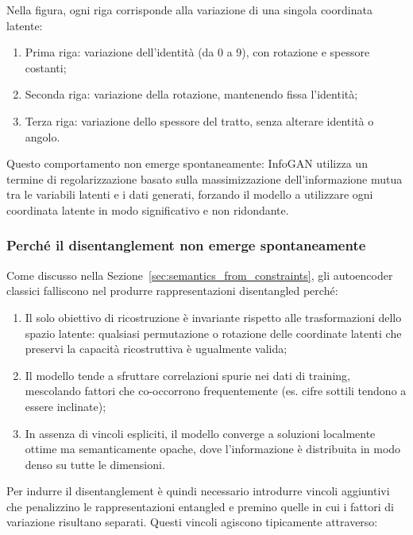 Nella figura, ogni riga corrisponde alla variazione di una singola coordinata latente:
\begin{enumerate}[label=\roman*.]
    \item Prima riga: variazione dell'identità (da 0 a 9), con rotazione e spessore costanti;
    \item Seconda riga: variazione della rotazione, mantenendo fissa l'identità;
    \item Terza riga: variazione dello spessore del tratto, senza alterare identità o angolo.
\end{enumerate}

Questo comportamento non emerge spontaneamente: InfoGAN utilizza un termine di regolarizzazione basato sulla massimizzazione dell'informazione mutua tra le variabili latenti e i dati generati, forzando il modello a utilizzare ogni coordinata latente in modo significativo e non ridondante.

\subsubsection{Perché il disentanglement non emerge spontaneamente}

Come discusso nella Sezione~\ref{sec:semantics_from_constraints}, gli autoencoder classici falliscono nel produrre rappresentazioni disentangled perché:

\begin{enumerate}[label=\roman*.]
    \item Il solo obiettivo di ricostruzione è invariante rispetto alle trasformazioni dello spazio latente: qualsiasi permutazione o rotazione delle coordinate latenti che preservi la capacità ricostruttiva è ugualmente valida;
    \item Il modello tende a sfruttare correlazioni spurie nei dati di training, mescolando fattori che co-occorrono frequentemente (es. cifre sottili tendono a essere inclinate);
    \item In assenza di vincoli espliciti, il modello converge a soluzioni localmente ottime ma semanticamente opache, dove l'informazione è distribuita in modo denso su tutte le dimensioni.
\end{enumerate}

Per indurre il disentanglement è quindi necessario introdurre vincoli aggiuntivi che penalizzino le rappresentazioni entangled e premino quelle in cui i fattori di variazione risultano separati. Questi vincoli agiscono tipicamente attraverso:

